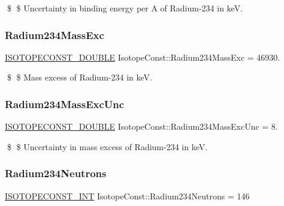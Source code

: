 \$ \$ Uncertainty in binding energy per A of Radium-\/234 in keV. \mbox{\label{group___isotope_const-_radium-_ra234_ga2b53375d1629b89296be505cb1692fac}} 
\subsubsection{\texorpdfstring{Radium234\+Mass\+Exc}{Radium234MassExc}}
{\footnotesize\ttfamily \mbox{\hyperlink{group___isotope_const-_macros_ga8f45a7272ce02c0b4c65c44636ed719a}{I\+S\+O\+T\+O\+P\+E\+C\+O\+N\+S\+T\+\_\+\+D\+O\+U\+B\+LE}} Isotope\+Const\+::\+Radium234\+Mass\+Exc = 46930.}

\$ \$ Mass excess of Radium-\/234 in keV. \mbox{\label{group___isotope_const-_radium-_ra234_ga8889345f102b6eb3e14aec635c182794}} 
\subsubsection{\texorpdfstring{Radium234\+Mass\+Exc\+Unc}{Radium234MassExcUnc}}
{\footnotesize\ttfamily \mbox{\hyperlink{group___isotope_const-_macros_ga8f45a7272ce02c0b4c65c44636ed719a}{I\+S\+O\+T\+O\+P\+E\+C\+O\+N\+S\+T\+\_\+\+D\+O\+U\+B\+LE}} Isotope\+Const\+::\+Radium234\+Mass\+Exc\+Unc = 8.}

\$ \$ Uncertainty in mass excess of Radium-\/234 in keV. \mbox{\label{group___isotope_const-_radium-_ra234_ga9af7d9100db8fe6e5155fb180ee6fbdd}} 
\subsubsection{\texorpdfstring{Radium234\+Neutrons}{Radium234Neutrons}}
{\footnotesize\ttfamily \mbox{\hyperlink{group___isotope_const-_macros_ga5f18360b3e99483a35c32d789e62621c}{I\+S\+O\+T\+O\+P\+E\+C\+O\+N\+S\+T\+\_\+\+I\+NT}} Isotope\+Const\+::\+Radium234\+Neutrons = 146}

